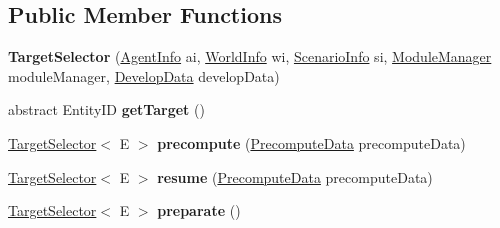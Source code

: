 \subsection*{Public Member Functions}
\begin{DoxyCompactItemize}
\item 
\hypertarget{classadf_1_1component_1_1module_1_1complex_1_1TargetSelector_a1723a710769dd4d72d597efc4d82aa06}{}\label{classadf_1_1component_1_1module_1_1complex_1_1TargetSelector_a1723a710769dd4d72d597efc4d82aa06} 
{\bfseries Target\+Selector} (\hyperlink{classadf_1_1agent_1_1info_1_1AgentInfo}{Agent\+Info} ai, \hyperlink{classadf_1_1agent_1_1info_1_1WorldInfo}{World\+Info} wi, \hyperlink{classadf_1_1agent_1_1info_1_1ScenarioInfo}{Scenario\+Info} si, \hyperlink{classadf_1_1agent_1_1module_1_1ModuleManager}{Module\+Manager} module\+Manager, \hyperlink{classadf_1_1agent_1_1develop_1_1DevelopData}{Develop\+Data} develop\+Data)
\item 
\hypertarget{classadf_1_1component_1_1module_1_1complex_1_1TargetSelector_a5dfc0499efad06d0d493ec73762fd5ee}{}\label{classadf_1_1component_1_1module_1_1complex_1_1TargetSelector_a5dfc0499efad06d0d493ec73762fd5ee} 
abstract Entity\+ID {\bfseries get\+Target} ()
\item 
\hypertarget{classadf_1_1component_1_1module_1_1complex_1_1TargetSelector_a501467964b79b07f6f3a66f1f14aecbd}{}\label{classadf_1_1component_1_1module_1_1complex_1_1TargetSelector_a501467964b79b07f6f3a66f1f14aecbd} 
\hyperlink{classadf_1_1component_1_1module_1_1complex_1_1TargetSelector}{Target\+Selector}$<$ E $>$ {\bfseries precompute} (\hyperlink{classadf_1_1agent_1_1precompute_1_1PrecomputeData}{Precompute\+Data} precompute\+Data)
\item 
\hypertarget{classadf_1_1component_1_1module_1_1complex_1_1TargetSelector_a74ab67b1d75088c5353c33c3040f02ec}{}\label{classadf_1_1component_1_1module_1_1complex_1_1TargetSelector_a74ab67b1d75088c5353c33c3040f02ec} 
\hyperlink{classadf_1_1component_1_1module_1_1complex_1_1TargetSelector}{Target\+Selector}$<$ E $>$ {\bfseries resume} (\hyperlink{classadf_1_1agent_1_1precompute_1_1PrecomputeData}{Precompute\+Data} precompute\+Data)
\item 
\hypertarget{classadf_1_1component_1_1module_1_1complex_1_1TargetSelector_aeb8e0c96975e745ca571bc0d2b98c631}{}\label{classadf_1_1component_1_1module_1_1complex_1_1TargetSelector_aeb8e0c96975e745ca571bc0d2b98c631} 
\hyperlink{classadf_1_1component_1_1module_1_1complex_1_1TargetSelector}{Target\+Selector}$<$ E $>$ {\bfseries preparate} ()
\item 

\end{DoxyCompactItemize}
